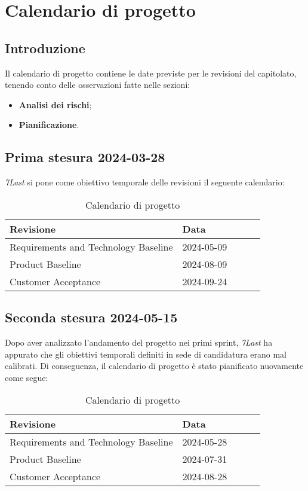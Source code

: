 \section{Calendario di progetto}
\subsection{Introduzione}
Il calendario di progetto contiene le date previste per le revisioni del capitolato, tenendo conto delle osservazioni fatte nelle sezioni:
\begin{itemize}
    \item \textbf{Analisi dei rischi};
    \item \textbf{Pianificazione}.
\end{itemize}

\subsection{Prima stesura 2024-03-28}
\textit{7Last} si pone come obiettivo temporale delle revisioni il seguente calendario:
\begin{table}[!h]
    \begin{center}
        \begin{tabular}{ | l | l | l | l | l | }
            \hline
            Revisione                               & Data       \\ \hline
            Requirements and Technology Baseline    & 2024-05-09 \\
            Product Baseline                        & 2024-08-09 \\
            Customer Acceptance                     & 2024-09-24 \\
            \hline
        \end{tabular}
    \end{center}
    \caption{Calendario di progetto}
\end{table}

\subsection{Seconda stesura 2024-05-15}
Dopo aver analizzato l'andamento del progetto nei primi sprint, \textit{7Last} ha appurato che gli obiettivi temporali definiti in sede di candidatura erano mal calibrati. Di conseguenza, il calendario di progetto è stato pianificato nuovamente come segue:
\begin{table}[!h]
    \begin{center}
        \begin{tabular}{ | l | l | l | l | l | }
            \hline
            Revisione                               & Data       \\ \hline
            Requirements and Technology Baseline    & 2024-05-28 \\
            Product Baseline                        & 2024-07-31 \\
            Customer Acceptance                     & 2024-08-28 \\
            \hline
        \end{tabular}
    \end{center}
    \caption{Calendario di progetto}
\end{table}